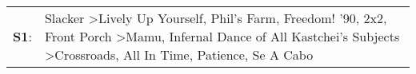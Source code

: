 \begin{supertabular}{p{0.03\textwidth}p{0.92\textwidth}}
 \textbf{S1}:  &  Slacker\textsuperscript{} \textgreater \enspace Lively Up Yourself\textsuperscript{}, \enspace Phil's Farm\textsuperscript{}, \enspace Freedom! '90\textsuperscript{}, \enspace 2x2\textsuperscript{}, \enspace Front Porch\textsuperscript{} \textgreater \enspace Mamu\textsuperscript{}, \enspace Infernal Dance of All Kastchei's Subjects\textsuperscript{} \textgreater \enspace Crossroads\textsuperscript{}, \enspace All In Time\textsuperscript{}, \enspace Patience\textsuperscript{}, \enspace Se A Cabo\textsuperscript{}  \enspace  \\
\end{supertabular}
